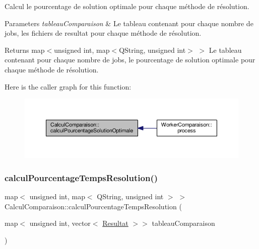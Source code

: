 Calcul le pourcentage de solution optimale pour chaque méthode de résolution. 


\begin{DoxyParams}{Parameters}
{\em tableau\+Comparaison} & Le tableau contenant pour chaque nombre de jobs, les fichiers de resultat pour chaque méthode de résolution. \\
\hline
\end{DoxyParams}
\begin{DoxyReturn}{Returns}
map$<$unsigned int, map$<$\+Q\+String, unsigned int$>$ $>$ Le tableau contenant pour chaque nombre de jobs, le pourcentage de solution optimale pour chaque méthode de résolution. 
\end{DoxyReturn}
Here is the caller graph for this function\+:\nopagebreak
\begin{figure}[H]
\begin{center}
\leavevmode
\includegraphics[width=350pt]{classCalculComparaison_a2e68afe2dcc785f580d7e0a365c2b607_icgraph}
\end{center}
\end{figure}
\mbox{\label{classCalculComparaison_a95460e5474d2abafd7a1c861d65785ea}} 
\subsubsection{\texorpdfstring{calcul\+Pourcentage\+Temps\+Resolution()}{calculPourcentageTempsResolution()}}
{\footnotesize\ttfamily map$<$ unsigned int, map$<$ Q\+String, unsigned int $>$ $>$ Calcul\+Comparaison\+::calcul\+Pourcentage\+Temps\+Resolution (\begin{DoxyParamCaption}\item[{map$<$ unsigned int, vector$<$ \hyperlink{classResultat}{Resultat} $>$$>$}]{tableau\+Comparaison }\end{DoxyParamCaption})}



